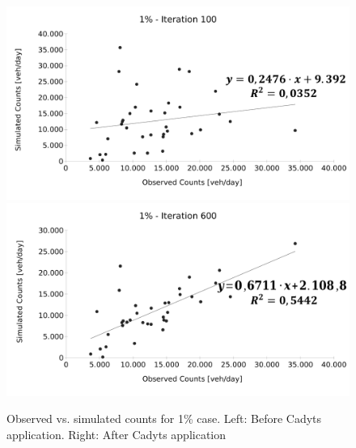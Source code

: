 \documentclass[Journal,letterpaper]{ascelike-new}
\begin{document}
\begin{figure}[h!]
	\centering
	\includegraphics[scale=0.22]{images/1pct_it100.pdf}\hspace{1cm}
	\includegraphics[scale=0.22]{images/1pct_it600.pdf}
	\caption{Observed vs. simulated counts for 1\% case. Left: Before Cadyts application. Right: After Cadyts application}
	\label{fig:obs_vs_sim_1pct}
\end{figure}
\end{document}
